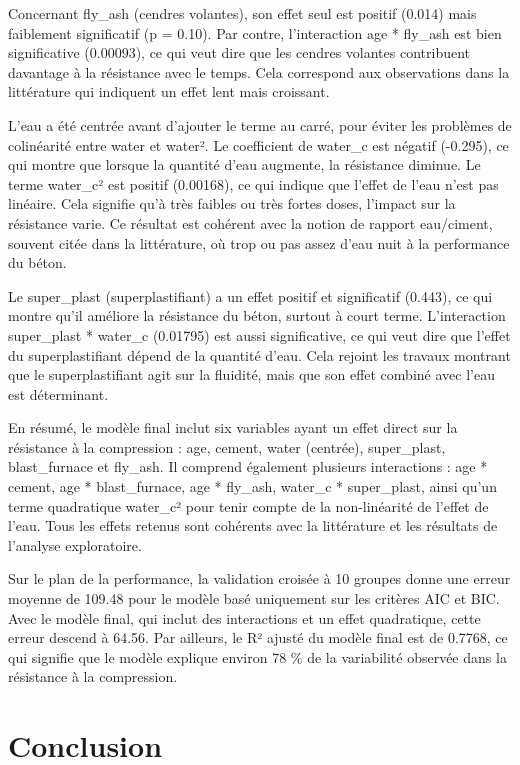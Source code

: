 \documentclass[
  12pt,
]{article}
\begin{document}
Concernant fly\_ash (cendres volantes), son effet seul est positif
(0.014) mais faiblement significatif (p = 0.10). Par contre,
l'interaction age * fly\_ash est bien significative (0.00093), ce qui
veut dire que les cendres volantes contribuent davantage à la résistance
avec le temps. Cela correspond aux observations dans la littérature qui
indiquent un effet lent mais croissant.

L'eau a été centrée avant d'ajouter le terme au carré, pour éviter les
problèmes de colinéarité entre water et water². Le coefficient de
water\_c est négatif (-0.295), ce qui montre que lorsque la quantité
d'eau augmente, la résistance diminue. Le terme water\_c² est positif
(0.00168), ce qui indique que l'effet de l'eau n'est pas linéaire. Cela
signifie qu'à très faibles ou très fortes doses, l'impact sur la
résistance varie. Ce résultat est cohérent avec la notion de rapport
eau/ciment, souvent citée dans la littérature, où trop ou pas assez
d'eau nuit à la performance du béton.

Le super\_plast (superplastifiant) a un effet positif et significatif
(0.443), ce qui montre qu'il améliore la résistance du béton, surtout à
court terme. L'interaction super\_plast * water\_c (0.01795) est aussi
significative, ce qui veut dire que l'effet du superplastifiant dépend
de la quantité d'eau. Cela rejoint les travaux montrant que le
superplastifiant agit sur la fluidité, mais que son effet combiné avec
l'eau est déterminant.

En résumé, le modèle final inclut six variables ayant un effet direct
sur la résistance à la compression : age, cement, water (centrée),
super\_plast, blast\_furnace et fly\_ash. Il comprend également
plusieurs interactions : age * cement, age * blast\_furnace, age *
fly\_ash, water\_c * super\_plast, ainsi qu'un terme quadratique
water\_c² pour tenir compte de la non-linéarité de l'effet de l'eau.
Tous les effets retenus sont cohérents avec la littérature et les
résultats de l'analyse exploratoire.

Sur le plan de la performance, la validation croisée à 10 groupes donne
une erreur moyenne de 109.48 pour le modèle basé uniquement sur les
critères AIC et BIC. Avec le modèle final, qui inclut des interactions
et un effet quadratique, cette erreur descend à 64.56. Par ailleurs, le
R² ajusté du modèle final est de 0.7768, ce qui signifie que le modèle
explique environ 78 \% de la variabilité observée dans la résistance à
la compression.

\section{Conclusion}\label{conclusion}
\end{document}
